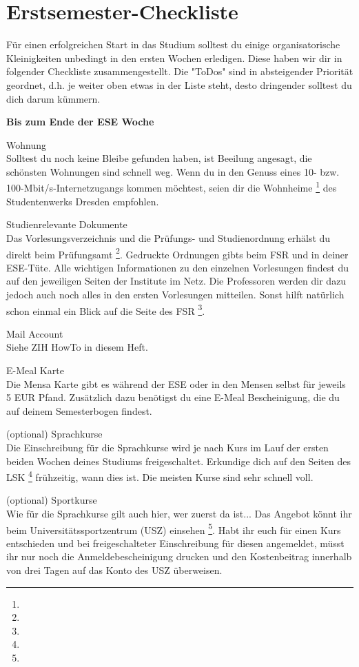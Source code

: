 \section{Erstsemester-Checkliste}

Für einen erfolgreichen Start in das Studium solltest du einige organisatorische Kleinigkeiten unbedingt in den ersten Wochen erledigen.
Diese haben wir dir in folgender Checkliste zusammengestellt.
Die "ToDos" sind in absteigender Priorität geordnet, d.h. je weiter oben etwas in der Liste steht, desto dringender solltest du dich darum kümmern.

\textbf{Bis zum Ende der ESE Woche}

Wohnung \\
Solltest du noch keine Bleibe gefunden haben, ist Beeilung angesagt, die schönsten Wohnungen sind schnell weg.
Wenn du in den Genuss eines 10- bzw. 100-Mbit/s-Internetzugangs kommen möchtest, seien dir die Wohnheime \footnote{} des Studentenwerks Dresden empfohlen.

Studienrelevante Dokumente \\
Das Vorlesungsverzeichnis und die Prüfungs- und Studienordnung erhälst du direkt beim Prüfungsamt \footnote{}.
Gedruckte Ordnungen gibts beim FSR und in deiner ESE-Tüte.
Alle wichtigen Informationen zu den einzelnen Vorlesungen findest du auf den jeweiligen Seiten der Institute im Netz.
Die Professoren werden dir dazu jedoch auch noch alles in den ersten Vorlesungen mitteilen. Sonst hilft natürlich schon einmal ein Blick auf die Seite des FSR \footnote{}.

Mail Account \\
Siehe ZIH HowTo in diesem Heft.

E-Meal Karte \\
Die Mensa Karte gibt es während der ESE oder in den Mensen selbst für jeweils 5 EUR Pfand.
Zusätzlich dazu benötigst du eine E-Meal Bescheinigung, die du auf deinem Semesterbogen findest.

(optional) Sprachkurse \\
Die Einschreibung für die Sprachkurse wird je nach Kurs im Lauf der ersten beiden Wochen deines Studiums freigeschaltet.
Erkundige dich auf den Seiten des LSK \footnote{} frühzeitig, wann dies ist. Die meisten Kurse sind sehr schnell voll.

(optional) Sportkurse \\
Wie für die Sprachkurse gilt auch hier, wer zuerst da ist...
Das Angebot könnt ihr beim Universitätssportzentrum (USZ) einsehen \footnote{}.
Habt ihr euch für einen Kurs entschieden und bei freigeschalteter Einschreibung für diesen angemeldet, müsst ihr nur noch die Anmeldebescheinigung drucken und den Kostenbeitrag innerhalb von drei Tagen auf das Konto des USZ überweisen.

